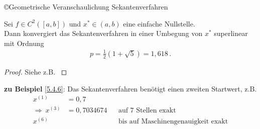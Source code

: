 \begin{image}{\copyright Geometrische Veranschaulichung Sekantenverfahren}
\end{image}
\label{im5.4.7}


\begin{Satze}
  Sei $f\in C^2([a,b])$ und $x^{*}\in (a,b)$ eine einfache Nullstelle.\\
  Dann konvergiert das Sekantenverfahren in einer Umbegung von $x^{*}$
  superlinear mit Ordnung 
  \begin{gather*}
    p=\frac{1}{2}(1+\sqrt{5})= 1,618 \, .
  \end{gather*}
\end{Satze}

\begin{proof}
  Siehe z.B. \cite[][Zwischenwertsatz, Fibonacci-Folge]{haemmerlinhoffmann,stoerbulirsch}
\end{proof}

\textbf{zu Beispiel} \ref{5.4.6}: Das Sekantenverfahren benötigt
einen zweiten Startwert, z.B.
\begin{align*}
  x^{(1)}&=0,7 \\
  \Rightarrow ~ x^{(3)} &= 0,7034674 
                        &&\text{auf 7 Stellen exakt}\\
  x^{(6)} &&& \text{bis auf Maschinengenauigkeit exakt}
\end{align*}


